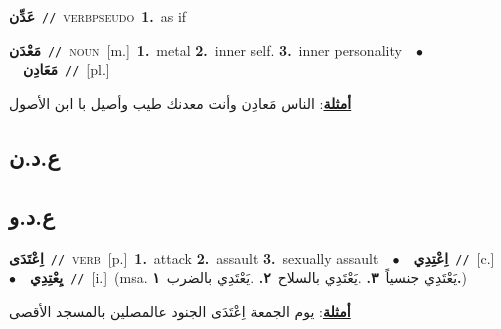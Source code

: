 \documentclass[10pt,a4paper,twoside]{article} %
\begin{document}
\begin{multicols}{2}
{\setlength\topsep{0pt}\textbf{\foreignlanguage{arabic}{عَدِّن}}\ {\color{gray}\texttt{//}\color{black}}\ \textsc{verb\textunderscore pseudo}\ \textbf{1.}~as if\ } \vspace{2mm}

{\setlength\topsep{0pt}\textbf{\foreignlanguage{arabic}{مَعْدَن}}\ {\color{gray}\texttt{//}\color{black}}\ \textsc{noun}\ [m.]\ \textbf{1.}~metal  \textbf{2.}~inner self.  \textbf{3.}~inner personality\ \ $\bullet$\ \ \setlength\topsep{0pt}\textbf{\foreignlanguage{arabic}{مَعَادِن}}\ {\color{gray}\texttt{//}\color{black}}\ [pl.]\  \begin{flushright}\color{gray}\foreignlanguage{arabic}{\textbf{\underline{\foreignlanguage{arabic}{أمثلة}}}: الناس مَعادِن وأنت معدنك طيب وأصيل با ابن الأصول}\end{flushright}\color{black}} \vspace{2mm}

\vspace{-3mm}
\subsection*{\color{blue}\foreignlanguage{arabic}{ع.د.ن}\color{blue}{ (ntws)}} 

\vspace{-3mm}
\subsection*{\color{blue}\foreignlanguage{arabic}{ع.د.و}\color{blue}{}} 

{\setlength\topsep{0pt}\textbf{\foreignlanguage{arabic}{اِعْتَدَى}}\ {\color{gray}\texttt{//}\color{black}}\ \textsc{verb}\ [p.]\ \textbf{1.}~attack  \textbf{2.}~assault  \textbf{3.}~sexually assault\ \ $\bullet$\ \ \setlength\topsep{0pt}\textbf{\foreignlanguage{arabic}{اِعْتِدِي}}\ {\color{gray}\texttt{//}\color{black}}\ [c.]\ \ $\bullet$\ \ \setlength\topsep{0pt}\textbf{\foreignlanguage{arabic}{يِعْتِدِي}}\ {\color{gray}\texttt{//}\color{black}}\ [i.]\ \color{gray}(msa. \foreignlanguage{arabic}{يَعْتَدِي جنسياً}~\foreignlanguage{arabic}{\textbf{٣.}}  .\foreignlanguage{arabic}{يَعْتَدِي بالسلاح}~\foreignlanguage{arabic}{\textbf{٢.}}  .\foreignlanguage{arabic}{يَعْتَدِي بالضرب}~\foreignlanguage{arabic}{\textbf{١.}})\color{black}\  \begin{flushright}\color{gray}\foreignlanguage{arabic}{\textbf{\underline{\foreignlanguage{arabic}{أمثلة}}}: يوم الجمعة اِعْتَدَى الجنود عالمصلين بالمسجد الأقصى}\end{flushright}\color{black}} \vspace{2mm}


\end{multicols}
\end{document}
